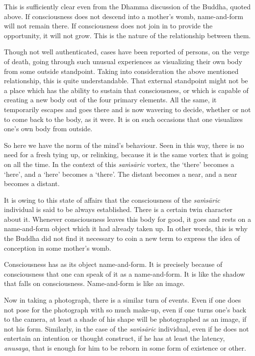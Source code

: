 This is sufficiently clear even from the Dhamma discussion of the Buddha, quoted above. If consciousness does not descend into a mother's womb, name-and-form will not remain there. If consciousness does not join in to provide the opportunity, it will not grow. This is the nature of the relationship between them.

Though not well authenticated, cases have been reported of persons, on the verge of death, going through such unusual experiences as visualizing their own body from some outside standpoint. Taking into consideration the above mentioned relationship, this is quite understandable. That external standpoint might not be a place which has the ability to sustain that consciousness, or which is capable of creating a new body out of the four primary elements. All the same, it temporarily escapes and goes there and is now wavering to decide, whether or not to come back to the body, as it were. It is on such occasions that one visualizes one's own body from outside.

So here we have the norm of the mind's behaviour. Seen in this way, there is no need for a fresh tying up, or relinking, because it is the same vortex that is going on all the time. In the context of this \emph{saṁsāric} vortex, the `there' becomes a `here', and a `here' becomes a `there'. The distant becomes a near, and a near becomes a distant.

It is owing to this state of affairs that the consciousness of the \emph{saṁsāric} individual is said to be always established. There is a certain twin character about it. Whenever consciousness leaves this body for good, it goes and rests on a name-and-form object which it had already taken up. In other words, this is why the Buddha did not find it necessary to coin a new term to express the idea of conception in some mother's womb.

Consciousness has as its object name-and-form. It is precisely because of consciousness that one can speak of it as a name-and-form. It is like the shadow that falls on consciousness. Name-and-form is like an image.

Now in taking a photograph, there is a similar turn of events. Even if one does not pose for the photograph with so much make-up, even if one turns one's back to the camera, at least a shade of his shape will be photographed as an image, if not his form. Similarly, in the case of the \emph{saṁsāric} individual, even if he does not entertain an intention or thought construct, if he has at least the latency, \emph{anusaya}, that is enough for him to be reborn in some form of existence or other.

